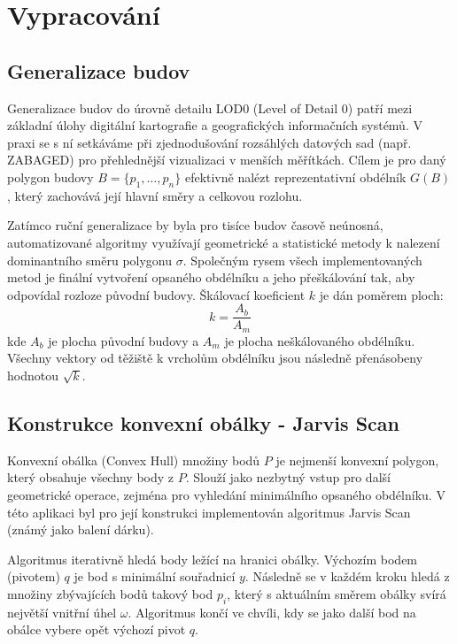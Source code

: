 \section{Vypracování}
\subsection{Generalizace budov}

Generalizace budov do úrovně detailu LOD0 (Level of Detail 0) patří mezi základní úlohy digitální kartografie a geografických informačních systémů. V praxi se s ní setkáváme při zjednodušování rozsáhlých datových sad (např. ZABAGED) pro přehlednější vizualizaci v menších měřítkách.
Cílem je pro daný polygon budovy $B = \{p_1, \dots, p_n\}$ efektivně nalézt reprezentativní obdélník $G(B)$, který zachovává její hlavní směry a celkovou rozlohu. 

Zatímco ruční generalizace by byla pro tisíce budov časově neúnosná, automatizované algoritmy využívají geometrické a statistické metody k nalezení dominantního směru polygonu $\sigma$. Společným rysem všech implementovaných metod je finální vytvoření opsaného obdélníku a jeho přeškálování tak, aby odpovídal rozloze původní budovy. 
Škálovací koeficient $k$ je dán poměrem ploch:
\[
  k = \frac{A_b}{A_m}
\]
kde $A_b$ je plocha původní budovy a $A_m$ je plocha neškálovaného obdélníku. Všechny vektory od těžiště k vrcholům obdélníku jsou následně přenásobeny hodnotou $\sqrt{k}$.


\subsection{Konstrukce konvexní obálky - Jarvis Scan}

Konvexní obálka (Convex Hull) množiny bodů $P$ je nejmenší konvexní polygon, který obsahuje všechny body z $P$. Slouží jako nezbytný vstup pro další geometrické operace, zejména pro vyhledání minimálního opsaného obdélníku. V této aplikaci byl pro její konstrukci implementován algoritmus Jarvis Scan (známý jako balení dárku).

Algoritmus iterativně hledá body ležící na hranici obálky. Výchozím bodem (pivotem) $q$ je bod s minimální souřadnicí $y$. Následně se v každém kroku hledá z množiny zbývajících bodů takový bod $p_i$, který s aktuálním směrem obálky svírá největší vnitřní úhel $\omega$. Algoritmus končí ve chvíli, kdy se jako další bod na obálce vybere opět výchozí pivot $q$.
\newpage

